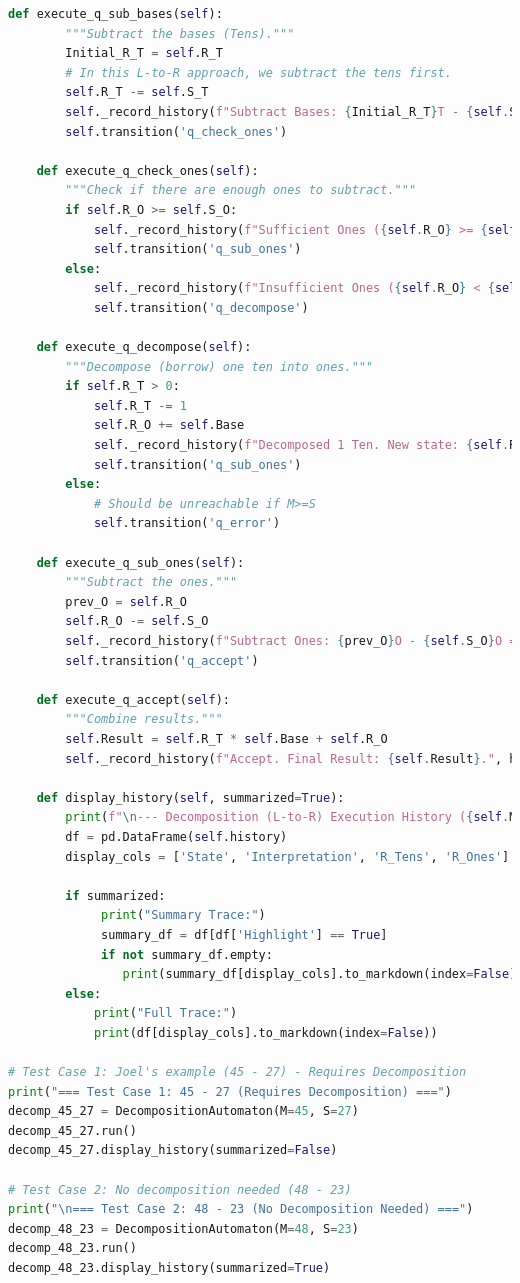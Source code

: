 \documentclass[11pt]{article}
\begin{document}
\begin{lstlisting}[language=Python]
    def execute_q_sub_bases(self):
        """Subtract the bases (Tens)."""
        Initial_R_T = self.R_T
        # In this L-to-R approach, we subtract the tens first.
        self.R_T -= self.S_T
        self._record_history(f"Subtract Bases: {Initial_R_T}T - {self.S_T}T = {self.R_T}T.", highlight=True)
        self.transition('q_check_ones')

    def execute_q_check_ones(self):
        """Check if there are enough ones to subtract."""
        if self.R_O >= self.S_O:
            self._record_history(f"Sufficient Ones ({self.R_O} >= {self.S_O}). Proceed.")
            self.transition('q_sub_ones')
        else:
            self._record_history(f"Insufficient Ones ({self.R_O} < {self.S_O}). Need decomposition.", highlight=True)
            self.transition('q_decompose')

    def execute_q_decompose(self):
        """Decompose (borrow) one ten into ones."""
        if self.R_T > 0:
            self.R_T -= 1
            self.R_O += self.Base
            self._record_history(f"Decomposed 1 Ten. New state: {self.R_T}T, {self.R_O}O.", highlight=True)
            self.transition('q_sub_ones')
        else:
            # Should be unreachable if M>=S
            self.transition('q_error')

    def execute_q_sub_ones(self):
        """Subtract the ones."""
        prev_O = self.R_O
        self.R_O -= self.S_O
        self._record_history(f"Subtract Ones: {prev_O}O - {self.S_O}O = {self.R_O}O.", highlight=True)
        self.transition('q_accept')

    def execute_q_accept(self):
        """Combine results."""
        self.Result = self.R_T * self.Base + self.R_O
        self._record_history(f"Accept. Final Result: {self.Result}.", highlight=True)

    def display_history(self, summarized=True):
        print(f"\n--- Decomposition (L-to-R) Execution History ({self.M} - {self.S}) ---")
        df = pd.DataFrame(self.history)
        display_cols = ['State', 'Interpretation', 'R_Tens', 'R_Ones']

        if summarized:
             print("Summary Trace:")
             summary_df = df[df['Highlight'] == True]
             if not summary_df.empty:
                print(summary_df[display_cols].to_markdown(index=False))
        else:
            print("Full Trace:")
            print(df[display_cols].to_markdown(index=False))

# Test Case 1: Joel's example (45 - 27) - Requires Decomposition
print("=== Test Case 1: 45 - 27 (Requires Decomposition) ===")
decomp_45_27 = DecompositionAutomaton(M=45, S=27)
decomp_45_27.run()
decomp_45_27.display_history(summarized=False)

# Test Case 2: No decomposition needed (48 - 23)
print("\n=== Test Case 2: 48 - 23 (No Decomposition Needed) ===")
decomp_48_23 = DecompositionAutomaton(M=48, S=23)
decomp_48_23.run()
decomp_48_23.display_history(summarized=True)
\end{lstlisting}
\end{document}
